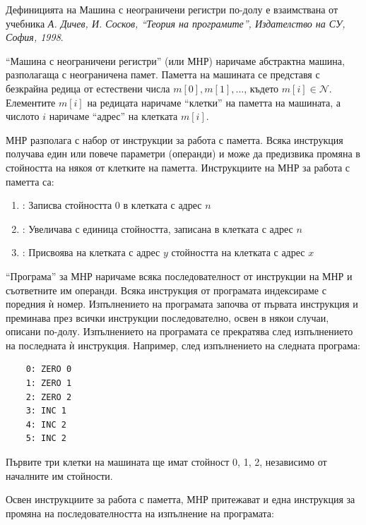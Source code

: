 \small{Дефиницията на Машина с неограничени регистри по-долу е взаимствана от учебника \cite{tprog}\textit{А. Дичев, И. Сосков, ``Теория на програмите'', Издателство на СУ, София, 1998}.

\vspace{20px}

\begin{mdframed}[hidealllines=true,backgroundcolor=gray!20]

	``Машина с неограничени регистри'' (или МНР) наричаме абстрактна машина, разполагаща с неограничена памет. Паметта на машината се представя с безкрайна редица от естествени числа $m[0],m[1],...$, където $m[i] \in \mathcal{N}$. Елементите $m[i]$ на редицата наричаме ``клетки'' на паметта на машината, а числото $i$ наричаме ``адрес'' на клетката $m[i]$.

	 МНР разполага с набор от инструкции за работа с паметта. Всяка инструкция получава един или повече параметри (операнди) и може да предизвика промяна в стойността на някоя от клетките на паметта. Инструкциите на МНР за работа с паметта са:

	\begin{enumerate}[label=\arabic*)]
		\item {}: Записва стойността 0 в клетката с адрес $n$
		\item {}: Увеличава с единица стойността, записана в клетката с адрес $n$
		\item {}: Присвоява на клетката с адрес $y$ стойността на клетката с адрес $x$
	\end{enumerate}

	``Програма'' за МНР наричаме всяка последователност от инструкции на МНР и съответните им операнди. Всяка инструкция от програмата индексираме с поредния ѝ номер. Изпълнението на програмата започва от първата инструкция и преминава през всички инструкции последователно, освен в някои случаи, описани по-долу. Изпълнението на програмата се прекратява след изпълнението на последната ѝ инструкция. Например, след изпълнението на следната програма:

	\begin{verbatim}
	0: ZERO 0
	1: ZERO 1
	2: ZERO 2
	3: INC 1
	4: INC 2
	5: INC 2
	\end{verbatim}

	Първите три клетки на машината ще имат стойност 0, 1, 2, независимо от началните им стойности.

	Освен инструкциите за работа с паметта, МНР притежават и една инструкция за промяна на последователността на изпълнение на програмата:


\end{mdframed}}
